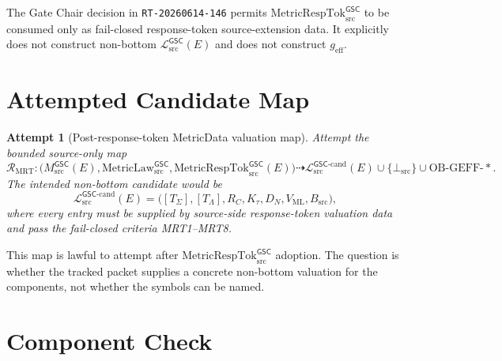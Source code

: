\documentclass[11pt]{article}
\newcommand{\MsrcGSC}{M_{\mathrm{src}}^{\mathsf{GSC}}}
\newcommand{\MetricLaw}{\mathrm{MetricLaw}_{\mathrm{src}}^{\mathsf{GSC}}}
\newcommand{\MetricRespTok}{\mathrm{MetricRespTok}_{\mathrm{src}}^{\mathsf{GSC}}}
\newcommand{\MetricData}{\mathcal{L}_{\mathrm{src}}^{\mathsf{GSC}}}
\newcommand{\MetricDataCand}{\mathcal{L}_{\mathrm{src}}^{\mathsf{GSC}\mbox{-}\mathrm{cand}}}
\newcommand{\BottomSrc}{\bot_{\mathrm{src}}}
\newcommand{\OBGEFF}{\mathrm{OB\mbox{-}GEFF}}
\newcommand{\geff}{g_{\mathrm{eff}}}
\newtheorem{attempt}{Attempt}
\begin{document}
The Gate Chair decision in \texttt{RT-20260614-146} permits
\(\MetricRespTok\) to be consumed only as fail-closed response-token
source-extension data. It explicitly does not construct non-bottom
\(\MetricData(E)\) and does not construct \(\geff\).

\section{Attempted Candidate Map}

\begin{attempt}[Post-response-token MetricData valuation map]
Attempt the bounded source-only map
\[
  \mathcal{R}_{\mathrm{MRT}}:
  \bigl(
    \MsrcGSC(E),
    \MetricLaw,
    \MetricRespTok(E)
  \bigr)
  \dashrightarrow
  \MetricDataCand(E)
  \cup
  \{\BottomSrc\}
  \cup
  \OBGEFF\mbox{-}*.
\]
The intended non-bottom candidate would be
\[
  \MetricDataCand(E)
  =
  \bigl(
    [T_{\Sigma}],
    [T_{\Lambda}],
    R_C,
    K_{\tau},
    D_N,
    V_{\mathrm{ML}},
    B_{\mathrm{src}}
  \bigr),
\]
where every entry must be supplied by source-side response-token valuation
data and pass the fail-closed criteria MRT1--MRT8.
\end{attempt}

This map is lawful to attempt after \(\MetricRespTok\) adoption. The question
is whether the tracked packet supplies a concrete non-bottom valuation for the
components, not whether the symbols can be named.

\section{Component Check}
\end{document}
